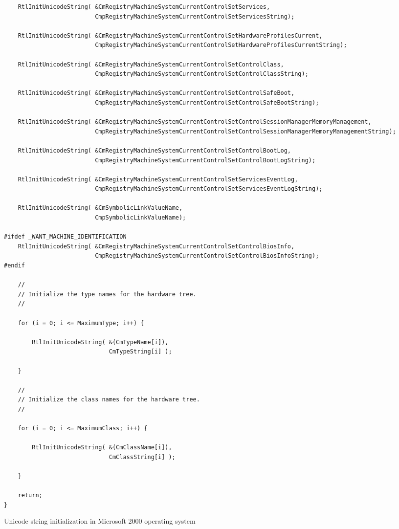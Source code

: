 \begin{listing}
\begin{verbatim}
    RtlInitUnicodeString( &CmRegistryMachineSystemCurrentControlSetServices,
                          CmpRegistryMachineSystemCurrentControlSetServicesString);

    RtlInitUnicodeString( &CmRegistryMachineSystemCurrentControlSetHardwareProfilesCurrent,
                          CmpRegistryMachineSystemCurrentControlSetHardwareProfilesCurrentString);

    RtlInitUnicodeString( &CmRegistryMachineSystemCurrentControlSetControlClass,
                          CmpRegistryMachineSystemCurrentControlSetControlClassString);

    RtlInitUnicodeString( &CmRegistryMachineSystemCurrentControlSetControlSafeBoot,
                          CmpRegistryMachineSystemCurrentControlSetControlSafeBootString);

    RtlInitUnicodeString( &CmRegistryMachineSystemCurrentControlSetControlSessionManagerMemoryManagement,
                          CmpRegistryMachineSystemCurrentControlSetControlSessionManagerMemoryManagementString);

    RtlInitUnicodeString( &CmRegistryMachineSystemCurrentControlSetControlBootLog,
                          CmpRegistryMachineSystemCurrentControlSetControlBootLogString);

    RtlInitUnicodeString( &CmRegistryMachineSystemCurrentControlSetServicesEventLog,
                          CmpRegistryMachineSystemCurrentControlSetServicesEventLogString);

    RtlInitUnicodeString( &CmSymbolicLinkValueName,
                          CmpSymbolicLinkValueName);

#ifdef _WANT_MACHINE_IDENTIFICATION
    RtlInitUnicodeString( &CmRegistryMachineSystemCurrentControlSetControlBiosInfo,
                          CmpRegistryMachineSystemCurrentControlSetControlBiosInfoString);
#endif

    //
    // Initialize the type names for the hardware tree.
    //

    for (i = 0; i <= MaximumType; i++) {

        RtlInitUnicodeString( &(CmTypeName[i]),
                              CmTypeString[i] );

    }

    //
    // Initialize the class names for the hardware tree.
    //

    for (i = 0; i <= MaximumClass; i++) {

        RtlInitUnicodeString( &(CmClassName[i]),
                              CmClassString[i] );

    }

    return;
}
\end{verbatim}
  \caption{Unicode string initialization in Microsoft 2000 operating system}
  \label{code:ms2000}
\end{listing}

